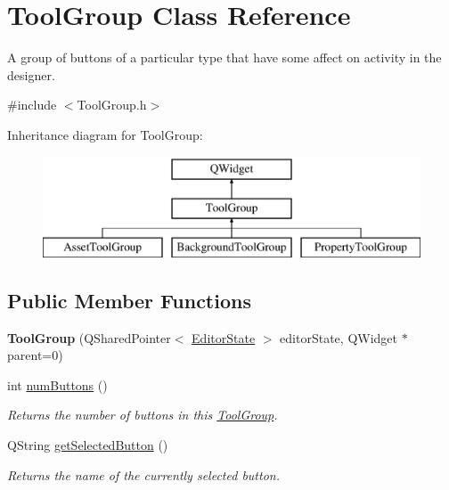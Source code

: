 \hypertarget{class_tool_group}{\section{Tool\-Group Class Reference}
\label{class_tool_group}
}


A group of buttons of a particular type that have some affect on activity in the designer.  




{\ttfamily \#include $<$Tool\-Group.\-h$>$}

Inheritance diagram for Tool\-Group\-:\begin{figure}[H]
\begin{center}
\leavevmode
\includegraphics[height=3.000000cm]{class_tool_group}
\end{center}
\end{figure}
\subsection*{Public Member Functions}
\begin{DoxyCompactItemize}
\item 
\hypertarget{class_tool_group_a121676093835a19312994e69a065549b}{{\bfseries Tool\-Group} (Q\-Shared\-Pointer$<$ \hyperlink{class_editor_state}{Editor\-State} $>$ editor\-State, Q\-Widget $\ast$parent=0)}\label{class_tool_group_a121676093835a19312994e69a065549b}

\item 
\hypertarget{class_tool_group_ac3ca9abf98f35c9bb6f7d8a5c4e8859e}{int \hyperlink{class_tool_group_ac3ca9abf98f35c9bb6f7d8a5c4e8859e}{num\-Buttons} ()}\label{class_tool_group_ac3ca9abf98f35c9bb6f7d8a5c4e8859e}

\begin{DoxyCompactList}\small\item\em Returns the number of buttons in this \hyperlink{class_tool_group}{Tool\-Group}. \end{DoxyCompactList}\item 
\hypertarget{class_tool_group_aeb7de8bf11951fa5ccfcd0be4ce22e1c}{Q\-String \hyperlink{class_tool_group_aeb7de8bf11951fa5ccfcd0be4ce22e1c}{get\-Selected\-Button} ()}\label{class_tool_group_aeb7de8bf11951fa5ccfcd0be4ce22e1c}

\begin{DoxyCompactList}\small\item\em Returns the name of the currently selected button. \end{DoxyCompactList}\end{DoxyCompactItemize}
